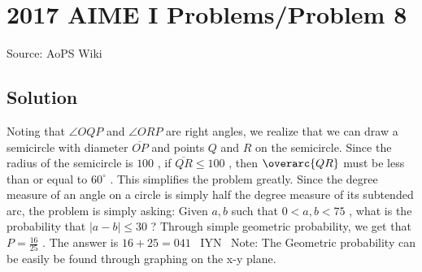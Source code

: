 \documentclass[12pt]{article}
\begin{document}
\section*{{2017 AIME I Problems/Problem 8}}
Source: AoPS Wiki

\subsection*{Solution}
Noting that $\angle OQP$ and $\angle ORP$ are right angles, we realize that we can draw a semicircle with diameter $\overline{OP}$ and points $Q$ and $R$ on the semicircle. Since the radius of the semicircle is $100$ , if $\overline{QR} \leq 100$ , then $\overarc{QR}$ must be less than or equal to $60^{\circ}$ . This simplifies the problem greatly. Since the degree measure of an angle on a circle is simply half the degree measure of its subtended arc, the problem is simply asking: Given $a, b$ such that $0<a, b<75$ , what is the probability that $|a-b| \leq 30$ ?
Through simple geometric probability, we get that $P = \frac{16}{25}$ . The answer is $16+25=\boxed{041}$ ~IYN~
Note: The Geometric probability can be easily be found through graphing on the x-y plane.
\end{document}
